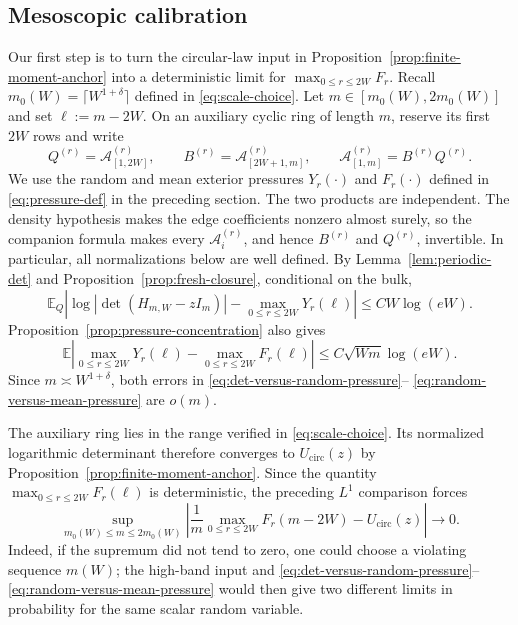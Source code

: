 \documentclass[11pt,reqno]{amsart}
\numberwithin{equation}{section}
\theoremstyle{definition}
\theoremstyle{remark}
\newcommand{\E}{\mathbb E}
\newcommand{\1}{\mathbf 1}
\newcommand{\cir}{\mathrm{circ}}
\begin{document}
\subsection{Mesoscopic calibration}
\label{sec:calibration}
Our first step is to turn the circular-law input in
Proposition~\ref{prop:finite-moment-anchor} into a deterministic limit for
\(\max_{0\leq r\leq2W}F_r\).
Recall $m_0(W)=\lceil W^{1+\delta}\rceil$ defined in \eqref{eq:scale-choice}.
Let \(m\in[m_0(W),2m_0(W)]\) and set \(\ell:=m-2W\).  On an auxiliary cyclic
ring of length $m$, reserve its first $2W$ rows and write
\begin{equation}\label{eq:cell-decomposition}
 Q^{(r)}=\mathcal A_{[1,2W]}^{(r)},\qquad
 B^{(r)}=\mathcal A_{[2W+1,m]}^{(r)},\qquad
 \mathcal A_{[1,m]}^{(r)}=B^{(r)}Q^{(r)}.
\end{equation}
We use the random and mean exterior pressures \(Y_r(\cdot)\) and
\(F_r(\cdot)\) defined in \eqref{eq:pressure-def} in the preceding
section.  The two products are independent.  The density hypothesis makes
the edge coefficients nonzero almost surely, so the companion formula
makes every \(\mathcal A_i^{(r)}\), and hence
\(B^{(r)}\) and \(Q^{(r)}\), invertible.  In particular, all
normalizations below are well defined.  By
Lemma~\ref{lem:periodic-det} and Proposition~\ref{prop:fresh-closure},
conditional on the bulk,
\begin{equation}\label{eq:det-versus-random-pressure}
 \E_Q\left|
 \log|\det(H_{m,W}-zI_m)|-\max_{0\le r\le2W}Y_r(\ell)
 \right|\le CW\log(eW).
\end{equation}
Proposition~\ref{prop:pressure-concentration} also gives
\begin{equation}\label{eq:random-versus-mean-pressure}
 \E\left|\max_{0\leq r\leq2W}Y_r(\ell)
 -\max_{0\leq r\leq2W}F_r(\ell)\right|
 \le C\sqrt{Wm}\log(eW).
\end{equation}
Since $m\asymp W^{1+\delta}$, both errors in
\eqref{eq:det-versus-random-pressure}--
\eqref{eq:random-versus-mean-pressure} are $o(m)$.

The auxiliary ring lies in the range verified in
\eqref{eq:scale-choice}.  Its normalized logarithmic determinant therefore
converges to $U_{\cir}(z)$ by
Proposition~\ref{prop:finite-moment-anchor}.  Since the quantity
\(\max_{0\leq r\leq2W}F_r(\ell)\) is deterministic, the preceding
\(L^1\) comparison forces
\begin{equation}\label{eq:mesoscopic-calibration}
 \sup_{m_0(W)\le m\le2m_0(W)}
 \left|\frac1m\max_{0\le r\le2W}F_r(m-2W)-U_{\cir}(z)\right|
 \longrightarrow0.
\end{equation}
Indeed, if the supremum did not tend to zero, one could choose a violating
sequence $m(W)$; the high-band input and
\eqref{eq:det-versus-random-pressure}--
\eqref{eq:random-versus-mean-pressure} would then give two different limits
in probability for the same scalar random variable.
\end{document}
